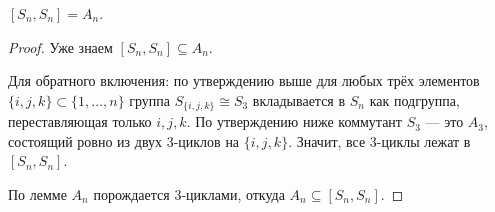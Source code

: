 \begin{theorem}
    $[S_n, S_n] = A_n$.
    \begin{proof}
        Уже знаем $[S_n, S_n] \subseteq A_n$.

        Для обратного включения: по утверждению выше для любых трёх элементов $\{i,j,k\} \subset \{1,\ldots,n\}$ группа
        $S_{\{i,j,k\}} \cong S_3$ вкладывается в $S_n$ как подгруппа, переставляющая только $i,j,k$. По утверждению ниже коммутант
        $S_3$ --- это $A_3$, состоящий ровно из двух 3-циклов на $\{i,j,k\}$. Значит, все 3-циклы лежат в
        $[S_n, S_n]$.

        По лемме $A_n$ порождается 3-циклами, откуда $A_n \subseteq [S_n, S_n]$.
    \end{proof}
\end{theorem}

